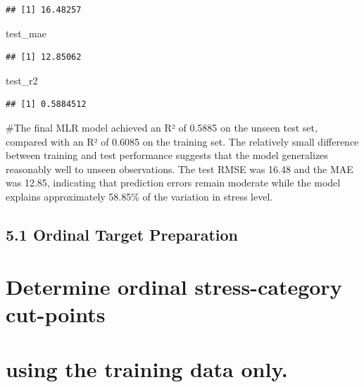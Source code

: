 \documentclass[
]{article}
\newenvironment{Shaded}{\begin{snugshade}}{\end{snugshade}}
\newcommand{\AttributeTok}[1]{\textcolor[rgb]{0.13,0.29,0.53}{#1}}
\newcommand{\ConstantTok}[1]{\textcolor[rgb]{0.56,0.35,0.01}{#1}}
\newcommand{\DecValTok}[1]{\textcolor[rgb]{0.00,0.00,0.81}{#1}}
\newcommand{\FunctionTok}[1]{\textcolor[rgb]{0.13,0.29,0.53}{\textbf{#1}}}
\newcommand{\NormalTok}[1]{#1}
\newcommand{\OtherTok}[1]{\textcolor[rgb]{0.56,0.35,0.01}{#1}}
\newcommand{\SpecialCharTok}[1]{\textcolor[rgb]{0.81,0.36,0.00}{\textbf{#1}}}
\begin{document}
\begin{verbatim}
## [1] 16.48257
\end{verbatim}

\begin{Shaded}
\begin{Highlighting}[]
\NormalTok{test\_mae}
\end{Highlighting}
\end{Shaded}

\begin{verbatim}
## [1] 12.85062
\end{verbatim}

\begin{Shaded}
\begin{Highlighting}[]
\NormalTok{test\_r2}
\end{Highlighting}
\end{Shaded}

\begin{verbatim}
## [1] 0.5884512
\end{verbatim}

\#The final MLR model achieved an R² of 0.5885 on the unseen test set,
compared with an R² of 0.6085 on the training set. The relatively small
difference between training and test performance suggests that the model
generalizes reasonably well to unseen observations. The test RMSE was
16.48 and the MAE was 12.85, indicating that prediction errors remain
moderate while the model explains approximately 58.85\% of the variation
in stress level.

\subsection{5.1 Ordinal Target
Preparation}\label{ordinal-target-preparation}

\section{Determine ordinal stress-category
cut-points}\label{determine-ordinal-stress-category-cut-points}

\section{using the training data
only.}\label{using-the-training-data-only.}

\begin{Shaded}
\end{Shaded}
\end{document}
